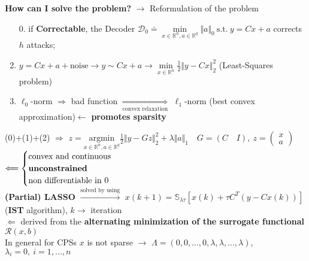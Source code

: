 \documentclass[a4paper, 12pt]{article}
\begin{document}
\vspace{-0.2cm}
\noindent
{\color{blue}\textbf{How can I solve the problem?} $\rightarrow$ Reformulation of the problem}
\begin{enumerate}
    \itemsep-0.2em
    \item[0.] if \textbf{Correctable}, the Decoder
    {\color{red} $\mathcal{D}_0 \doteq \underset{x\in\mathbb{R}^n,a\in\mathbb{R}^q}{\min} \Vert a \Vert_0 \ \text{s.t.} \ y=Cx+a $ }corrects $h$ attacks; 
    \item $y=Cx+a+\text{noise} \longrightarrow y\sim Cx+a \longrightarrow \underset{x\in\mathbb{R}^n}{\min} \frac{1}{2}\Vert y-Cx \Vert_2^2$ (Least-Squares problem)
    \item $\ell_0$-norm $\Rightarrow$ bad function $\underset{\text{convex relaxation}}{\Longrightarrow}$ $\ell_1$-norm {\small(best convex approximation)$\leftarrow$ \textbf{promotes sparsity}}
\end{enumerate}
\vspace{-0.5cm}
(0)+(1)+(2) $\Longrightarrow$ 
{\color{red}
$z=\underset{x\in\mathbb{R}^n, a\in\mathbb{R}^q}{\text{argmin}}
\frac{1}{2} \Vert y-Gz \Vert_2^2 + \lambda \Vert a \Vert_1 \quad
G=(C \quad I), \ z=\begin{pmatrix} x\\a \end{pmatrix}
$
}  $\Longleftarrow \begin{cases}
        \text{convex and continuous}\\
        \text{\textbf{unconstrained}}\\
        \text{non differentiable in 0}
\end{cases}$\\
\textbf{(Partial) LASSO} $\overset{\text{solved by using}}{\longrightarrow}$ $x(k+1)=\mathbb{S}_{\lambda\tau}[x(k)+\tau C^T(y-Cx(k))]$ (\textbf{IST} algorithm), {\small{$k\rightarrow$  iteration}} \\$\Longleftarrow$
derived from the \textbf{alternating minimization of the surrogate functional} $\mathcal{R}(x,b)$\\
In general for CPSs $x$ is not sparse $\longrightarrow$ $\Lambda=(0,0,...,0,\lambda, \lambda,...,\lambda)$, $\lambda_i=0, \ i=1,...,n$\\
\end{document}
